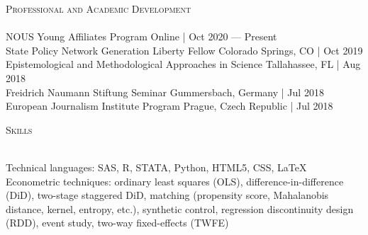 \documentclass[a4paper,11pt]{article}
\newcommand{\lineunder} {
    \vspace*{-8pt} \\
    \hspace*{-18pt} \hrulefill \\
}
\newcommand{\header} [1] {
    {\hspace*{-18pt}\vspace*{6pt} \textsc{\large{#1}}}
    \vspace*{-6pt} \lineunder
}
\begin{document}
\header{Professional and Academic Development} 
\vspace{1mm}
NOUS Young Affiliates Program \hfill Online | Oct 2020 --- Present \\
\vspace{1mm}
State Policy Network Generation Liberty Fellow \hfill Colorado Springs, CO | Oct 2019 \\
\vspace{1mm}
Epistemological and Methodological Approaches in Science \hfill Tallahassee, FL | Aug 2018\\
\vspace{1mm}
Freidrich Naumann Stiftung Seminar \hfill Gummersbach, Germany | Jul 2018\\
\vspace{1mm}
European Journalism Institute Program \hfill Prague, Czech Republic | Jul 2018
\vspace{2mm}

\header{Skills}
\vspace{1mm}

Technical languages: SAS, R, STATA, Python, HTML5, CSS, \LaTeX \\

\vspace{1mm}
Econometric techniques: ordinary least squares (OLS), difference-in-difference (DiD), two-stage staggered DiD, matching (propensity score, Mahalanobis distance, kernel, entropy, etc.), synthetic control, regression discontinuity design (RDD), event study, two-way fixed-effects (TWFE)
\end{document}
